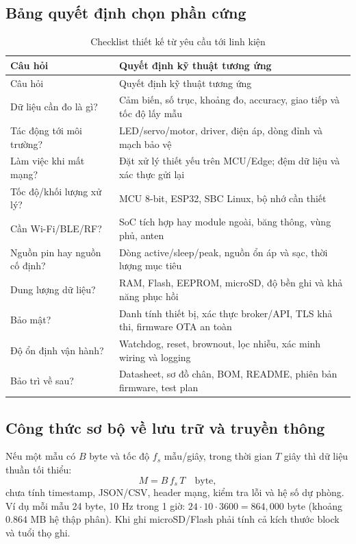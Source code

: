 \subsection{Bảng quyết định chọn phần cứng}
\begin{longtable}{p{43mm}p{100mm}}
\caption{Checklist thiết kế từ yêu cầu tới linh kiện}\label{tab:hwsel}\\
\toprule
Câu hỏi & Quyết định kỹ thuật tương ứng\\\midrule\endfirsthead
\toprule Câu hỏi & Quyết định kỹ thuật tương ứng\\\midrule\endhead
Dữ liệu cần đo là gì? & Cảm biến, số trục, khoảng đo, accuracy, giao tiếp và tốc độ lấy mẫu\\
Tác động tới môi trường? & LED/servo/motor, driver, điện áp, dòng đỉnh và mạch bảo vệ\\
Làm việc khi mất mạng? & Đặt xử lý thiết yếu trên MCU/Edge; đệm dữ liệu và xác thực gửi lại\\
Tốc độ/khối lượng xử lý? & MCU 8-bit, ESP32, SBC Linux, bộ nhớ cần thiết\\
Cần Wi-Fi/BLE/RF? & SoC tích hợp hay module ngoài, băng thông, vùng phủ, anten\\
Nguồn pin hay nguồn cố định? & Dòng active/sleep/peak, nguồn ổn áp và sạc, thời lượng mục tiêu\\
Dung lượng dữ liệu? & RAM, Flash, EEPROM, microSD, độ bền ghi và khả năng phục hồi\\
Bảo mật? & Danh tính thiết bị, xác thực broker/API, TLS khả thi, firmware OTA an toàn\\
Độ ổn định vận hành? & Watchdog, reset, brownout, lọc nhiễu, xác minh wiring và logging\\
Bảo trì về sau? & Datasheet, sơ đồ chân, BOM, README, phiên bản firmware, test plan\\\bottomrule
\end{longtable}

\subsection{Công thức sơ bộ về lưu trữ và truyền thông}
Nếu một mẫu có $B$ byte và tốc độ $f_s$ mẫu/giây, trong thời gian $T$ giây thì dữ liệu thuần tối thiểu:
\begin{equation}\boxed{M=B\,f_s\,T}\quad\text{byte},\end{equation}
chưa tính timestamp, JSON/CSV, header mạng, kiểm tra lỗi và hệ số dự phòng. Ví dụ mỗi mẫu 24 byte, 10 Hz trong 1 giờ: $24\cdot10\cdot3600=864{,}000$ byte (khoảng $0.864$ MB hệ thập phân). Khi ghi microSD/Flash phải tính cả kích thước block và tuổi thọ ghi.

